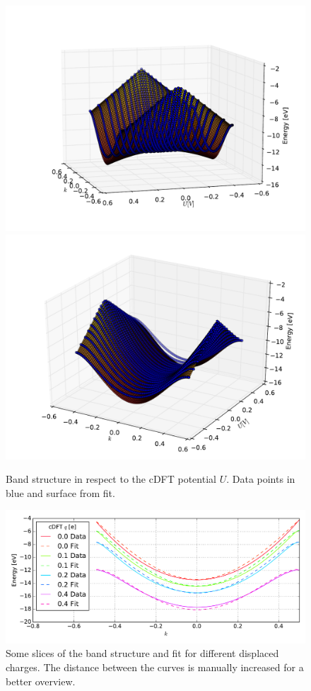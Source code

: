 \begin{figure}[!p]
	\centering
	\includegraphics[width = 13cm]{Images/Hydrogen/charging/3D/figure_1-2}
	\includegraphics[width = 13cm]{Images/Hydrogen/charging/3D/figure_1-1}
	\caption{Band structure in respect to the cDFT potential $U$. Data points in blue and surface from fit.}
	\label{image_hydrogen_3D_2}
\end{figure}

\begin{figure}
	\centering
	\includegraphics[width = 13cm]{Images/Hydrogen/charging/3D_cuts}
	\caption{Some slices of the band structure and fit for different displaced charges. The distance between the curves is manually increased for a better overview.}
	\label{image_hydrogen_3D_slices}
\end{figure}


